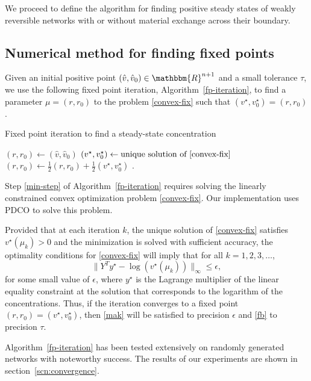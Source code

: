 \documentclass[smallextended]{svjour3}       %
\newcommand*{\0}{\mathbf{0}}
\newcommand*{\1}{\mathbf{1}}
\newcommand*{\R}{\mathbbm{R}}
\begin{document}
We proceed to define the algorithm for finding positive steady states of weakly
reversible networks with or without material exchange across their 
boundary.

\subsection{Numerical method for finding fixed points}

Given an initial positive point $(\hat v, \hat v_0) \in \R^{n+1}$ and a small
tolerance $\tau$, we use the following fixed point iteration,
Algorithm~\ref{fp-iteration}, to find a parameter $\mu = (r, r_0)$ to
the problem \eqref{convex-fix} such that $(v^\star,v_0^\star) =
(r,r_0)$.

\begin{algorithm}
\caption{Fixed point iteration to find a steady-state concentration}
\label{fp-iteration}
\begin{algorithmic}[1]
  \STATE $(r,r_0) \gets (\hat v,\hat v_0)$
  \STATE $(v^\star,v^\star_0)\gets \text{unique solution of \eqref{convex-fix}} $
		\label{min-step}
	\STATE $(r,r_0) \gets \frac{1}{2}(r,r_0) +\frac{1}{2}(v^\star,v^\star_0)$
  \ENDWHILE
  \label{fixpoint-alg}.
\end{algorithmic}
\end{algorithm}

Step \ref{min-step} of Algorithm~\ref{fp-iteration} requires
solving the linearly constrained convex optimization problem
\eqref{convex-fix}. Our implementation uses PDCO \cite{pdco} to
solve this problem.

Provided that at each iteration $k$, the unique solution of \eqref{convex-fix}
satisfies $v^\star(\mu_k)>0$ and the minimization is solved with sufficient
accuracy, the optimality conditions for \eqref{convex-fix} will imply that for
all $k = 1, 2, 3, \dots$,
\[
	\|Y^Ty^\star-\log(v^\star(\mu_k))\|_\infty \leq \epsilon,
\] 
for some small value of $\epsilon$, where $y^\star$ is the Lagrange
multiplier of the linear equality constraint at the solution that corresponds
to the logarithm of the concentrations. Thus, if the iteration
converges to a fixed point $(r,r_0) = (v^\star,v_0^\star)$, then
\eqref{mak} will be satisfied to precision $\epsilon$ and \eqref{fb}
to precision $\tau$.

Algorithm~\ref{fp-iteration} has been tested extensively on randomly generated
networks with noteworthy success. The results of our experiments are shown in
section~\ref{scn:convergence}.
\end{document}
